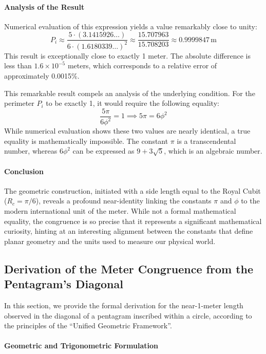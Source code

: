 \documentclass[11pt]{article}
\begin{document}
\paragraph{Analysis of the Result}

Numerical evaluation of this expression yields a value remarkably close to unity:
\[
P_i \approx \frac{5 \cdot (3.1415926\dots)}{6 \cdot (1.6180339\dots)^2} \approx \frac{15.707963}{15.708203} \approx 0.9999847\,\text{m}
\]
This result is exceptionally close to exactly 1 meter. The absolute difference is less than $1.6 \times 10^{-5}$ meters, which corresponds to a relative error of approximately 0.0015\%.

This remarkable result compels an analysis of the underlying condition. For the perimeter $P_i$ to be exactly 1, it would require the following equality:
\[
\frac{5\pi}{6\phi^2} = 1 \implies 5\pi = 6\phi^2
\]
While numerical evaluation shows these two values are nearly identical, a true equality is mathematically impossible. The constant $\pi$ is a transcendental number, whereas $6\phi^2$ can be expressed as $9 + 3\sqrt{5}$, which is an algebraic number.

\paragraph{Conclusion}

The geometric construction, initiated with a side length equal to the Royal Cubit ($R_c = \pi/6$), reveals a profound near-identity linking the constants $\pi$ and $\phi$ to the modern international unit of the meter. While not a formal mathematical equality, the congruence is so precise that it represents a significant mathematical curiosity, hinting at an interesting alignment between the constants that define planar geometry and the units used to measure our physical world.

\subsection{Derivation of the Meter Congruence from the Pentagram's Diagonal}
\label{sec:derivation_meter_congruence}

In this section, we provide the formal derivation for the near-1-meter length observed in the diagonal of a pentagram inscribed within a circle, according to the principles of the ``Unified Geometric Framework''.

\paragraph{Geometric and Trigonometric Formulation}
\end{document}
